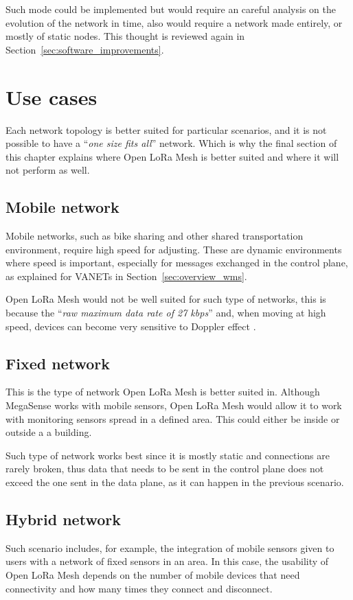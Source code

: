 		Such mode could be implemented but would require an careful analysis on the evolution of the network in time, also would require a network made entirely, or mostly of static nodes.
		This thought is reviewed again in Section~\ref{sec:software_improvements}.
			
	\section{Use cases}
		
		Each network topology is better suited for particular scenarios, and it is not possible to have a ``\textit{one size fits all}'' network.
		Which is why the final section of this chapter explains where Open LoRa Mesh is better suited and where it will not perform as well.
		
		\subsection{Mobile network}
		
			Mobile networks, such as bike sharing and other shared transportation environment, require high speed for adjusting. 
			These are dynamic environments where speed is important, especially for messages exchanged in the control plane, as explained for VANETs in Section~\ref{sec:overview_wms}.
			
			Open LoRa Mesh would not be well suited for such type of networks, this is because the ``\textit{raw maximum data rate of 27 kbps}'' \cite{8030482} and, when moving at high speed, devices can become very sensitive to Doppler effect \cite{s21124049}.
		
		\subsection{Fixed network}\label{sec:fixed_network}
		
			This is the type of network Open LoRa Mesh is better suited in.
			Although MegaSense works with mobile sensors, Open LoRa Mesh would allow it to work with monitoring sensors spread in a defined area.
			This could either be inside or outside a a building.
			
			Such type of network works best since it is mostly static and connections are rarely broken, thus data that needs to be sent in the control plane does not exceed the one sent in the data plane, as it can happen in the previous scenario.
		
		\subsection{Hybrid network}
		
			Such scenario includes, for example, the integration of mobile sensors given to users with a network of fixed sensors in an area.
			In this case, the usability of Open LoRa Mesh depends on the number of mobile devices that need connectivity and how many times they connect and disconnect.
			